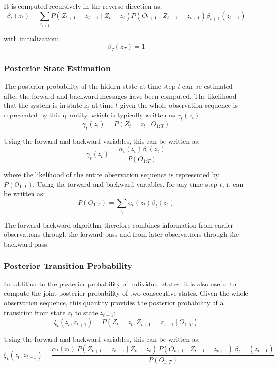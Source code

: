 It is computed recursively in the reverse direction as:
\begin{equation}
\beta_t(z_t) =
\sum_{z_{t+1}}
P(Z_{t+1} = z_{t+1} \mid Z_t = z_t)
P(O_{t+1} \mid Z_{t+1} = z_{t+1})
\beta_{t+1}(z_{t+1})
\label{eq:backward_recursion}
\end{equation}

with initialization:
\[
\beta_T(z_T) = 1
\]



\subsubsection{Posterior State Estimation}
The posterior probability of the hidden state at time step \(t\) can be estimated after the forward and backward messages have been computed.
The likelihood that the system is in state $z_t$ at time $t$ given the whole observation sequence is represented by this quantity, which is typically written as $\gamma_t(z_t)$.
\[
\gamma_t(z_t) = P(Z_t = z_t \mid O_{1:T})
\]

Using the forward and backward variables, this can be written as:
\begin{equation}
\gamma_t(z_t) = 
\frac{\alpha_t(z_t)\beta_t(z_t)}{P(O_{1:T})}
\label{eq:gamma_posterior}
\end{equation}

where the likelihood of the entire observation sequence is represented by \(P(O_{1:T})\). Using the forward and backward variables, for any time step $t$, it can be written as:
\[
P(O_{1:T}) = \sum_{z_t} \alpha_t(z_t)\beta_t(z_t)
\]


\par The forward-backward algorithm therefore combines information from earlier observations through the forward pass and from later observations through the backward pass.


\subsubsection{Posterior Transition Probability}

In addition to the posterior probability of individual states, it is also useful to compute the joint posterior probability of two consecutive states. 
Given the whole observation sequence, this quantity provides the posterior probability of a transition from state $z_t$ to state $z_{t+1}$:
\[
\xi_t(z_t, z_{t+1}) =
P(Z_t = z_t, Z_{t+1} = z_{t+1} \mid O_{1:T})
\]

Using the forward and backward variables, this can be written as:
\begin{equation}
\xi_t(z_t, z_{t+1}) =
\frac{\alpha_t(z_t)\,
P(Z_{t+1}=z_{t+1}\mid Z_t=z_t)\,
P(O_{t+1}\mid Z_{t+1}=z_{t+1})\,
\beta_{t+1}(z_{t+1})}
{P(O_{1:T})}
\label{eq:xi_posterior}
\end{equation}

